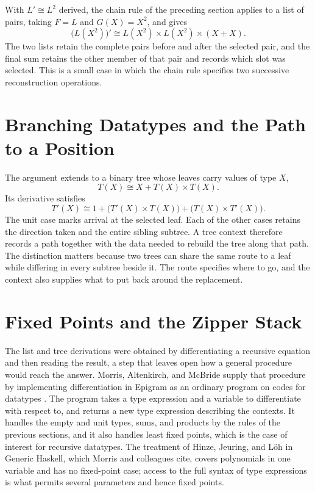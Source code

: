 \documentclass[11pt]{article}
\begin{document}
With $L'\cong L^2$ derived, the chain rule of the preceding section applies to a list of pairs, taking $F=L$ and $G(X)=X^2$, and gives
\[
\bigl(L(X^2)\bigr)'\cong L(X^2)\times L(X^2)\times(X+X).
\]
The two lists retain the complete pairs before and after the selected pair, and the final sum retains the other member of that pair and records which slot was selected. This is a small case in which the chain rule specifies two successive reconstruction operations.

\section{Branching Datatypes and the Path to a Position}

The argument extends to a binary tree whose leaves carry values of type $X$,
\[
T(X)\cong X+T(X)\times T(X).
\]
Its derivative satisfies
\[
T'(X)\cong 1+\bigl(T'(X)\times T(X)\bigr)+\bigl(T(X)\times T'(X)\bigr).
\]
The unit case marks arrival at the selected leaf. Each of the other cases retains the direction taken and the entire sibling subtree. A tree context therefore records a path together with the data needed to rebuild the tree along that path. The distinction matters because two trees can share the same route to a leaf while differing in every subtree beside it. The route specifies where to go, and the context also supplies what to put back around the replacement.

\section{Fixed Points and the Zipper Stack}

The list and tree derivations were obtained by differentiating a recursive equation and then reading the result, a step that leaves open how a general procedure would reach the answer. Morris, Altenkirch, and McBride supply that procedure by implementing differentiation in Epigram as an ordinary program on codes for datatypes \cite{morris2006}. The program takes a type expression and a variable to differentiate with respect to, and returns a new type expression describing the contexts. It handles the empty and unit types, sums, and products by the rules of the previous sections, and it also handles least fixed points, which is the case of interest for recursive datatypes. The treatment of Hinze, Jeuring, and L\"oh in Generic Haskell, which Morris and colleagues cite, covers polynomials in one variable and has no fixed-point case; access to the full syntax of type expressions is what permits several parameters and hence fixed points.
\end{document}
